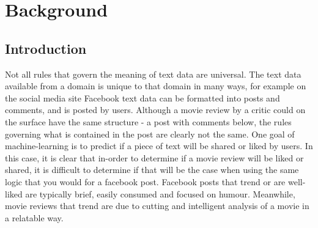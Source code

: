 \chapter{Background}




\section{Introduction}







Not all rules that govern the meaning of text data are universal. The text data available from a domain is unique to that domain in many ways, for example on the social media site Facebook text data can be formatted into posts and comments, and is posted by users. Although a movie review by a critic could on the surface have the same structure - a post with comments below, the rules governing what is contained in the post are clearly not the same. One goal of machine-learning is to predict if a piece of text will be shared or liked by users. In this case, it is clear that in-order to determine if a movie review will be liked or shared, it is difficult to determine if that will be the case when using the same logic that you would for a facebook post. Facebook posts that trend or are well-liked are typically brief, easily consumed and focused on humour. Meanwhile, movie reviews that trend are due to cutting and intelligent analysis of a movie in a relatable way. %

